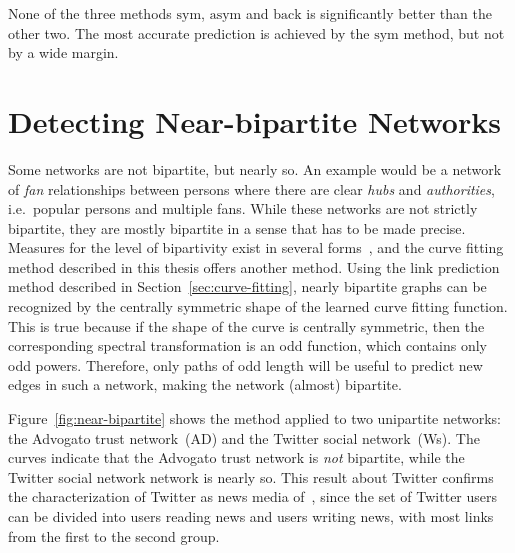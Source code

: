 \documentclass[11pt,a4paper]{book}
\begin{document}
None of the three methods $\mathrm{sym}$, $\mathrm{asym}$ and
$\mathrm{back}$ is significantly better than the other two.  
The most accurate prediction is achieved by the $\mathrm{sym}$ method,
but not by a wide margin. 

\section{Detecting Near-bipartite Networks}
\label{sec:near-bipartite}
Some networks are not bipartite, but nearly so.  An example would be a
network of \emph{fan} relationships between persons where there are clear
\emph{hubs} and \emph{authorities}, i.e.\ popular persons and multiple fans.
While these networks are not strictly bipartite, they are mostly
bipartite in a sense that has to be made precise.  Measures for the
level of bipartivity exist in several forms~\cite{b531,b456}, 
and
the curve fitting method described in this thesis
offers another method.  Using the link
prediction method described in Section~\ref{sec:curve-fitting}, nearly
bipartite graphs can be recognized by the centrally symmetric shape of
the learned curve fitting function.
This is true because if the shape of the curve is centrally symmetric,
then the corresponding spectral transformation is an odd function, which
contains only odd powers.  Therefore, only paths of odd length will be
useful to predict new edges in such a network, making the network
(almost) bipartite. 

Figure~\ref{fig:near-bipartite} shows the method applied to two
unipartite networks:  the Advogato trust network~(\textsf{AD}) and the
Twitter social network~(\textsf{Ws}).  The curves
indicate that the Advogato trust network is \emph{not} bipartite, while
the Twitter social network network is nearly so.  
This result about Twitter confirms the characterization of Twitter as 
news media of~\cite{b545}, since the set of Twitter users can be divided into
users reading news and users writing news, with most links from the
first to the second group. 
\end{document}

